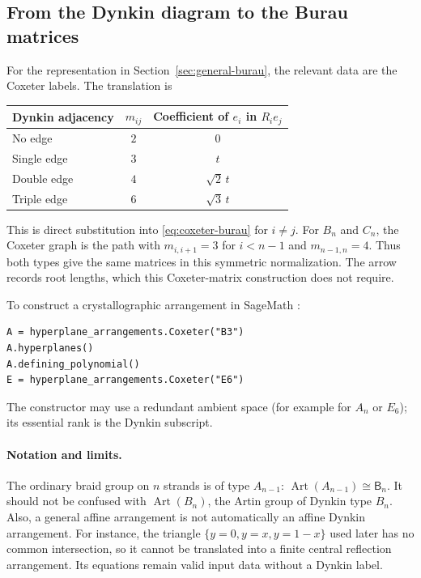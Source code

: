 \documentclass[11pt,a4paper]{article}
\theoremstyle{remark}\newtheorem{remark}[theorem]{Remark}
\begin{document}
\subsection*{From the Dynkin diagram to the Burau matrices}
For the representation in Section~\ref{sec:general-burau}, the relevant
data are the Coxeter labels.  The translation is
\begin{center}
\begin{tabular}{lcc}
\toprule
Dynkin adjacency & $m_{ij}$ & Coefficient of $e_i$ in $R_i e_j$\\
\midrule
No edge & $2$ & $0$\\
Single edge & $3$ & $t$\\
Double edge & $4$ & $\sqrt2\,t$\\
Triple edge & $6$ & $\sqrt3\,t$\\
\bottomrule
\end{tabular}
\end{center}
This is direct substitution into \eqref{eq:coxeter-burau} for $i\ne j$.
For $B_n$ and $C_n$, the Coxeter graph is the path with
$m_{i,i+1}=3$ for $i<n-1$ and $m_{n-1,n}=4$.
Thus both types give the same matrices in this symmetric normalization.
The arrow records root lengths, which this Coxeter-matrix construction
does not require.

To construct a crystallographic arrangement in SageMath \cite{SageArr}:
\begin{verbatim}
A = hyperplane_arrangements.Coxeter("B3")
A.hyperplanes()
A.defining_polynomial()
E = hyperplane_arrangements.Coxeter("E6")
\end{verbatim}
The constructor may use a redundant ambient space (for example for
$A_n$ or $E_6$); its essential rank is the Dynkin subscript.

\paragraph{Notation and limits.}
The ordinary braid group on $n$ strands is of type $A_{n-1}$:
$\operatorname{Art}(A_{n-1})\cong\mathsf B_n$.
It should not be confused with $\operatorname{Art}(B_n)$, the Artin
group of Dynkin type $B_n$.
Also, a general affine arrangement is not automatically an affine
Dynkin arrangement.  For instance, the triangle
$\{y=0,y=x,y=1-x\}$ used later has no common intersection, so it
cannot be translated into a finite central reflection arrangement.
Its equations remain valid input data without a Dynkin label.
\end{document}
